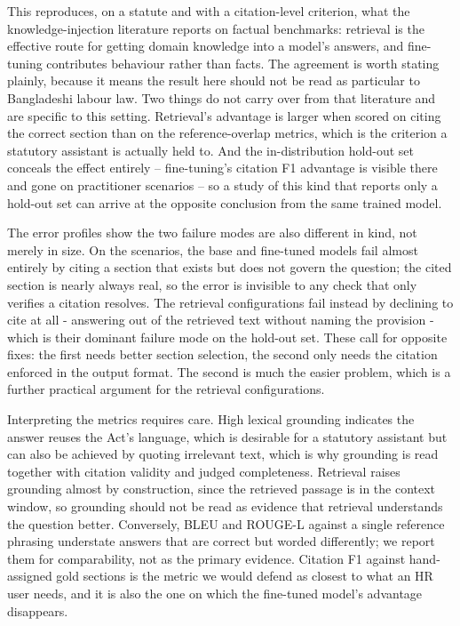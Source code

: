 \documentclass[11pt,a4paper]{article}
\begin{document}
This reproduces, on a statute and with a citation-level criterion, what the knowledge-injection literature reports on factual benchmarks\cite{ref_ragvsft,ref_ragft_popularity,ref_ragft_agri}: retrieval is the effective route for getting domain knowledge into a model's answers, and fine-tuning contributes behaviour rather than facts. The agreement is worth stating plainly, because it means the result here should not be read as particular to Bangladeshi labour law. Two things do not carry over from that literature and are specific to this setting. Retrieval's advantage is larger when scored on citing the correct section than on the reference-overlap metrics, which is the criterion a statutory assistant is actually held to. And the in-distribution hold-out set conceals the effect entirely -- fine-tuning's citation F1 advantage is visible there and gone on practitioner scenarios -- so a study of this kind that reports only a hold-out set can arrive at the opposite conclusion from the same trained model.

The error profiles show the two failure modes are also different in kind, not merely in size. On the scenarios, the base and fine-tuned models fail almost entirely by citing a section that exists but does not govern the question; the cited section is nearly always real, so the error is invisible to any check that only verifies a citation resolves. The retrieval configurations fail instead by declining to cite at all - answering out of the retrieved text without naming the provision - which is their dominant failure mode on the hold-out set. These call for opposite fixes: the first needs better section selection, the second only needs the citation enforced in the output format. The second is much the easier problem, which is a further practical argument for the retrieval configurations.

Interpreting the metrics requires care. High lexical grounding indicates the answer reuses the Act's language, which is desirable for a statutory assistant but can also be achieved by quoting irrelevant text, which is why grounding is read together with citation validity and judged completeness. Retrieval raises grounding almost by construction, since the retrieved passage is in the context window, so grounding should not be read as evidence that retrieval understands the question better. Conversely, BLEU and ROUGE-L against a single reference phrasing understate answers that are correct but worded differently; we report them for comparability, not as the primary evidence. Citation F1 against hand-assigned gold sections is the metric we would defend as closest to what an HR user needs, and it is also the one on which the fine-tuned model's advantage disappears.
\end{document}
